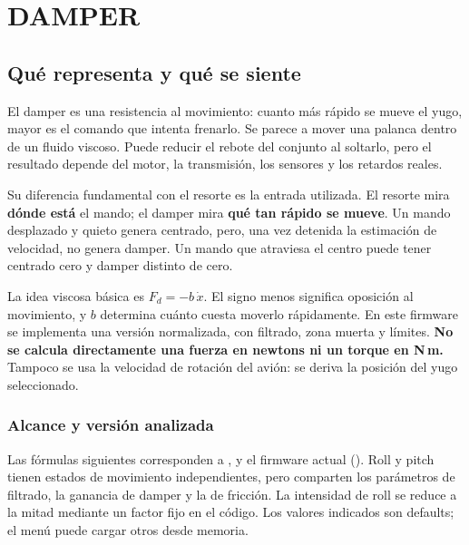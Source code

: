 \section{DAMPER}
\label{sec:damper}

\subsection{Qué representa y qué se siente}
El damper es una resistencia al movimiento: cuanto más rápido se mueve el yugo, mayor es el comando que intenta frenarlo. Se parece a mover una palanca dentro de un fluido viscoso. Puede reducir el rebote del conjunto al soltarlo, pero el resultado depende del motor, la transmisión, los sensores y los retardos reales.

Su diferencia fundamental con el resorte es la entrada utilizada. El resorte mira \textbf{dónde está} el mando; el damper mira \textbf{qué tan rápido se mueve}. Un mando desplazado y quieto genera centrado, pero, una vez detenida la estimación de velocidad, no genera damper. Un mando que atraviesa el centro puede tener centrado cero y damper distinto de cero.

La idea viscosa básica es $F_d=-b\,\dot{x}$. El signo menos significa oposición al movimiento, y $b$ determina cuánto cuesta moverlo rápidamente. En este firmware se implementa una versión normalizada, con filtrado, zona muerta y límites. \textbf{No se calcula directamente una fuerza en newtons ni un torque en N\,m.} Tampoco se usa la velocidad de rotación del avión: se deriva la posición del yugo seleccionado.

\subsubsection{Alcance y versión analizada}
Las fórmulas siguientes corresponden a ,  y el firmware actual (). Roll y pitch tienen estados de movimiento independientes, pero comparten los parámetros de filtrado, la ganancia de damper y la de fricción. La intensidad de roll se reduce a la mitad mediante un factor fijo en el código. Los valores indicados son defaults; el menú puede cargar otros desde memoria.

